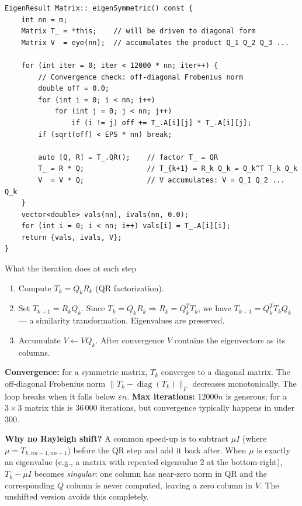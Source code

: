 \documentclass[12pt, a4paper]{article}
\begin{document}
\begin{lstlisting}
EigenResult Matrix::_eigenSymmetric() const {
    int nn = m;
    Matrix T_ = *this;    // will be driven to diagonal form
    Matrix V  = eye(nn);  // accumulates the product Q_1 Q_2 Q_3 ...

    for (int iter = 0; iter < 12000 * nn; iter++) {
        // Convergence check: off-diagonal Frobenius norm
        double off = 0.0;
        for (int i = 0; i < nn; i++)
            for (int j = 0; j < nn; j++)
                if (i != j) off += T_.A[i][j] * T_.A[i][j];
        if (sqrt(off) < EPS * nn) break;

        auto [Q, R] = T_.QR();    // factor T_ = QR
        T_ = R * Q;               // T_{k+1} = R_k Q_k = Q_k^T T_k Q_k
        V  = V * Q;               // V accumulates: V = Q_1 Q_2 ... Q_k
    }
    vector<double> vals(nn), ivals(nn, 0.0);
    for (int i = 0; i < nn; i++) vals[i] = T_.A[i][i];
    return {vals, ivals, V};
}
\end{lstlisting}

\begin{flowbox}{What the iteration does at each step}
\begin{enumerate}[noitemsep]
  \item Compute $T_k = Q_k R_k$ (QR factorization).
  \item Set $T_{k+1} = R_k Q_k$.  Since $T_k = Q_k R_k \Rightarrow
        R_k = Q_k^T T_k$, we have $T_{k+1} = Q_k^T T_k Q_k$ --- a similarity
        transformation.  Eigenvalues are preserved.
  \item Accumulate $V \leftarrow V Q_k$.  After convergence $V$ contains the
        eigenvectors as its columns.
\end{enumerate}
\textbf{Convergence:} for a symmetric matrix, $T_k$ converges to a diagonal
matrix. The off-diagonal Frobenius norm $\|T_k - \operatorname{diag}(T_k)\|_F$
decreases monotonically. The loop breaks when it falls below $\varepsilon n$.
\textbf{Max iterations:} $12000n$ is generous; for a $3\times3$ matrix this is
36\,000 iterations, but convergence typically happens in under 300.
\end{flowbox}

\noindent
\textbf{Why no Rayleigh shift?}  A common speed-up is to subtract $\mu I$
(where $\mu = T_{k,nn-1,nn-1}$) before the QR step and add it back after.
When $\mu$ is exactly an eigenvalue (e.g., a matrix with repeated eigenvalue 2
at the bottom-right), $T_k - \mu I$ becomes \emph{singular}: one column has
near-zero norm in QR and the corresponding $Q$ column is never computed,
leaving a zero column in $V$.  The unshifted version avoids this completely.
\end{document}
